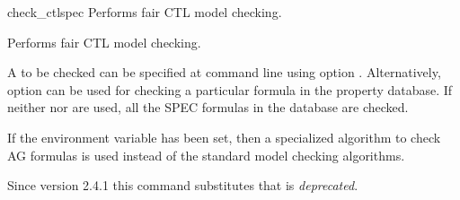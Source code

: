 \begin{nusmvCommand}{check\_ctlspec} {Performs fair CTL model checking.}


Performs fair CTL model checking.

A \ctlexpr to be checked can be specified at command line using
option . Alternatively, option  can be
used for checking a particular formula in the property database. If
neither  nor  are used, all the SPEC
formulas in the database are checked.\\
\begin{cmdOpt}


            


\end{cmdOpt}
  If the  environment variable has been set,
  then a specialized algorithm to check AG formulas is used instead of
  the standard model checking algorithms.

  Since version 2.4.1 this command substitutes  that
  is \emph{deprecated}.

\end{nusmvCommand}

